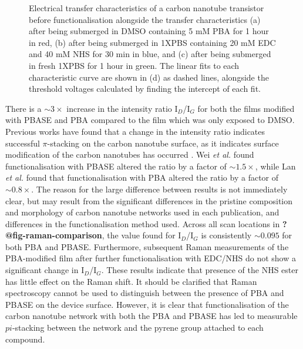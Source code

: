 \documentclass[
  a4paper,
]{scrbook}
\begin{document}
\begin{figure}
\begin{minipage}[t]{0.50\linewidth}
{{}

}

\subcaption{\label{fig-pba-threshold-shift-comparison}}
\end{minipage}%

\caption{\label{fig-pba-functionalisation-threshold-shift}Electrical
transfer characteristics of a carbon nanotube transistor before
functionalisation alongside the transfer characteristics (a) after being
submerged in DMSO containing 5 mM PBA for 1 hour in red, (b) after being
submerged in 1XPBS containing 20 mM EDC and 40 mM NHS for 30 min in
blue, and (c) after being submerged in fresh 1XPBS for 1 hour in green.
The linear fits to each characteristic curve are shown in (d) as dashed
lines, alongside the threshold voltages calculated by finding the
intercept of each fit.}

\end{figure}

There is a \(\sim 3 \times\) increase in the intensity ratio
I\(_D\)/I\(_G\) for both the films modified with PBASE and PBA compared
to the film which was only exposed to DMSO. Previous works have found
that a change in the intensity ratio indicates successful
\(\pi\)-stacking on the carbon nanotube surface, as it indicates surface
modification of the carbon nanotubes has occurred
\autocite{Wei2010,Lan2013}. Wei \emph{et al.} \autocite{Wei2010} found
functionalisation with PBASE altered the ratio by a factor of
\(\sim 1.5 \times\), while Lan \emph{et al.} \autocite{Lan2013} found
that functionalisation with PBA altered the ratio by a factor of
\(\sim 0.8 \times\). The reason for the large difference between results
is not immediately clear, but may result from the significant
differences in the pristine composition and morphology of carbon
nanotube networks used in each publication, and differences in the
functionalisation method used. Across all scan locations in
\textbf{?@fig-raman-comparison}, the value found for I\(_D\)/I\(_G\) is
consistently \(\sim 0.095\) for both PBA and PBASE. Furthermore,
subsequent Raman measurements of the PBA-modified film after further
functionalisation with EDC/NHS do not show a significant change in
I\(_D\)/I\(_G\). These results indicate that presence of the NHS ester
has little effect on the Raman shift. It should be clarified that Raman
spectroscopy cannot be used to distinguish between the presence of PBA
and PBASE on the device surface. However, it is clear that
functionalisation of the carbon nanotube network with both the PBA and
PBASE has led to measurable \(pi\)-stacking between the network and the
pyrene group attached to each compound.
\end{document}
